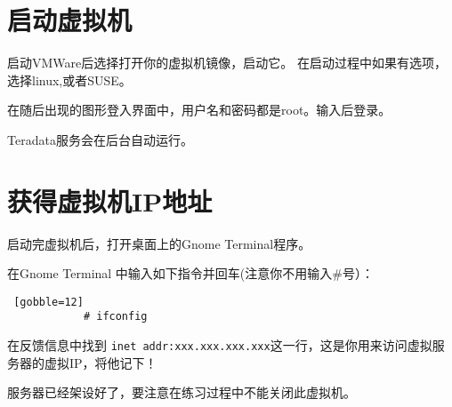 \documentclass{article}
\begin{document}

	\section{启动虚拟机} %
		
		启动VMWare后选择打开你的虚拟机镜像，启动它。
		在启动过程中如果有选项，选择linux,或者SUSE。

		在随后出现的图形登入界面中，用户名和密码都是root。输入后登录。

		Teradata服务会在后台自动运行。

	\section{获得虚拟机IP地址} %
	
		
		
		启动完虚拟机后，打开桌面上的Gnome Terminal程序。

		在Gnome Terminal 中输入如下指令并回车(注意你不用输入\#号）：

		\begin{lstlisting} [gobble=12]
			# ifconfig
		\end{lstlisting}

		在反馈信息中找到 \lstinline|inet addr:xxx.xxx.xxx.xxx|这一行，这是你用来访问虚拟服务器的虚拟IP，将他记下！ 

		

		服务器已经架设好了，要注意在练习过程中不能关闭此虚拟机。



\end{document}
